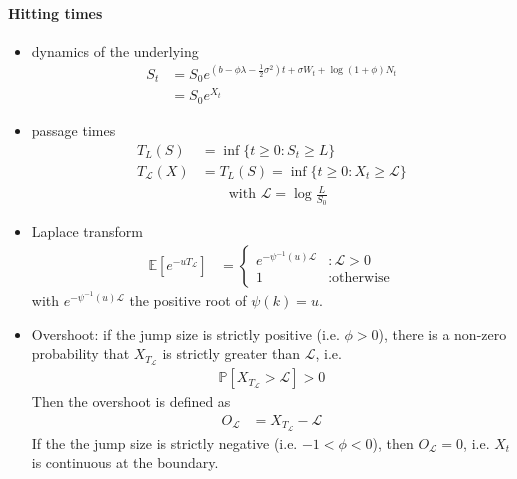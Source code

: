 \documentclass[a4paper,landscape,8pt,fleqn]{scrartcl}
\begin{document}
\begin{multicols*}{4}
\paragraph{Hitting times}
\begin{itemize}
\item dynamics of the underlying
\begin{align*}
S_t &= S_0 e^{ \left( b - \phi \lambda - \frac{1}{2} \sigma^2 \right) t + \sigma W_t + \log(1+\phi) N_t} \\
&= S_0 e^{X_t}
\end{align*}
\item passage times
\begin{align*}
T_L(S) &= \inf \lbrace t \geq 0 : S_t \geq L \rbrace \\
T_\mathcal{L}(X) &= T_L(S) = \inf \lbrace t \geq 0 : X_t \geq \mathcal{L} \rbrace \\
&\qquad \text{with } \mathcal{L} = \log \frac{L}{S_0}
\end{align*}
\item Laplace transform
\begin{align*}
\mathbb{E} \left[ e^{-u T_\mathcal{L}} \right] &=
\begin{cases}
e^{-\psi^{-1}(u) \mathcal{L}} & : \mathcal{L} > 0 \\
1 & : \text{otherwise}
\end{cases}
\end{align*}
with $e^{-\psi^{-1}(u) \mathcal{L}}$ the positive root of $\psi(k) = u$.
\item Overshoot: if the jump size is strictly positive (i.e. $\phi > 0$), there is a non-zero probability that $X_{T_\mathcal{L}}$ is strictly greater than $\mathcal{L}$, i.e.
\begin{align*}
\mathbb{P}[X_{T_\mathcal{L}} > \mathcal{L}] > 0
\end{align*}
Then the overshoot is defined as
\begin{align*}
O_\mathcal{L} &= X_{T_\mathcal{L}} - \mathcal{L}
\end{align*}
If the the jump size is strictly negative (i.e. $-1 < \phi < 0$), then $O_\mathcal{L} = 0$, i.e. $X_t$ is continuous at the boundary.
\end{itemize}


\end{multicols*}
\end{document}
